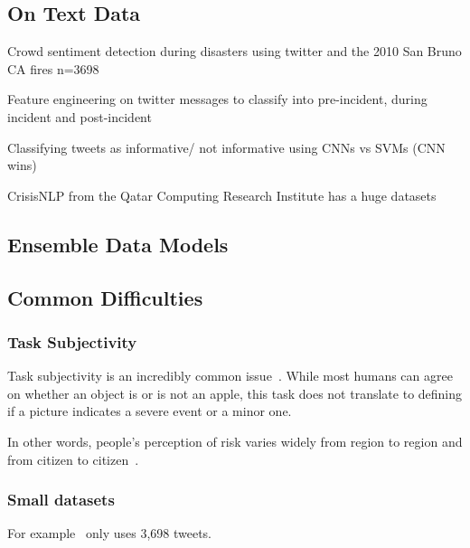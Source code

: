 \subsection{On Text Data}
Crowd sentiment detection during disasters using twitter and the 2010 San Bruno
CA fires n=3698
\cite{nagyCrowdSentimentDetection2012}

Feature engineering on twitter messages to classify into pre-incident, during
incident and post-incident
\cite{chowdhuryTweet4actUsingIncidentspecific2013}


Classifying tweets as informative/ not informative using CNNs vs SVMs (CNN wins)
\cite{carageaIdentifyingInformativeMessages2016}



CrisisNLP from the Qatar Computing Research Institute
has a huge datasets 
\cite{nguyenRapidClassificationCrisisRelated}





\subsection{Ensemble Data Models}

\subsection{Common Difficulties}
\subsubsection{Task Subjectivity}
Task subjectivity is an incredibly common
issue~\cite{nguyenDamageAssessmentSocial2017, quarantelliUrbanVulnerabilityDisasters2003}. While most humans can agree on
whether an object is or is not an apple, this task does not translate to
defining if a picture indicates a severe event or a minor one. 

In other words, people's perception of risk varies widely from region to region
and from citizen to citizen~\cite{quarantelliUrbanVulnerabilityDisasters2003}.

\subsubsection{Small datasets}
For example~\cite{nagyCrowdSentimentDetection2012} only uses 3,698 tweets.
